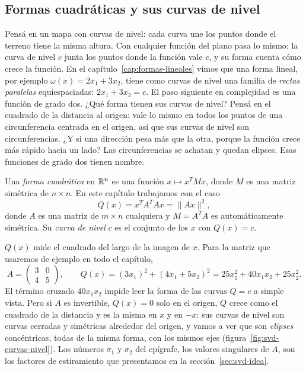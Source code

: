 \subsection{Formas cuadráticas y sus curvas de nivel}

Pensá en un mapa con curvas de nivel: cada curva une los puntos donde el terreno tiene la misma
altura. Con cualquier función del plano pasa lo mismo: la curva de nivel \(c\) junta los puntos
donde la función vale \(c\), y su forma cuenta cómo crece la función. En el
capítulo~\ref{cap:formas-lineales} vimos que una forma lineal, por ejemplo
\(\omega(x)=2x_1+3x_2\), tiene como curvas de nivel una familia de \emph{rectas paralelas}
equiespaciadas: \(2x_1+3x_2=c\). El paso siguiente en complejidad es una función de grado
dos.
¿Qué forma tienen sus curvas de nivel?
Pensá en el cuadrado de la distancia al origen: vale lo mismo en todos los puntos de una
circunferencia centrada en el origen, así que sus curvas de nivel son circunferencias.
¿Y si una dirección pesa más que la otra, porque la función crece más rápido hacia un lado?
Las circunferencias se achatan y quedan elipses. Esas funciones de grado dos tienen nombre.

\begin{definicion}
Una \emph{forma cuadrática} en \(\mathbb{R}^n\) es una función \(x\mapsto x^TMx\), donde \(M\) es una
matriz simétrica de \(n\times n\). En este capítulo trabajamos con el caso
\[
  Q(x)=x^TA^TAx=\|Ax\|^2 ,
\]
donde \(A\) es una matriz de \(m\times n\) cualquiera y \(M=A^TA\) es automáticamente
simétrica. Su \emph{curva de nivel} \(c\) es el conjunto de los \(x\) con \(Q(x)=c\).
\end{definicion}

\(Q(x)\) mide el cuadrado del largo de la imagen de \(x\). Para la matriz que usaremos de
ejemplo en todo el capítulo,
\[
  A=\begin{pmatrix}3&0\\4&5\end{pmatrix},\qquad
  Q(x)=(3x_1)^2+(4x_1+5x_2)^2=25x_1^2+40x_1x_2+25x_2^2 .
\]
El término cruzado \(40x_1x_2\) impide leer la forma de las curvas \(Q=c\) a simple vista.
Pero si \(A\) es invertible, \(Q(x)=0\) solo en el origen, \(Q\) crece como el cuadrado de la
distancia y es la misma en \(x\) y en \(-x\): sus curvas de nivel son curvas cerradas y
simétricas alrededor del origen, y vamos a ver que son \emph{elipses} concéntricas, todas de
la misma forma, con los mismos ejes (figura~\ref{fig:svd-curvas-nivel}). Los números
\(\sigma_1\) y \(\sigma_2\) del epígrafe, los valores singulares de \(A\), son los factores de
estiramiento que presentamos en la sección~\ref{sec:svd-idea}.

